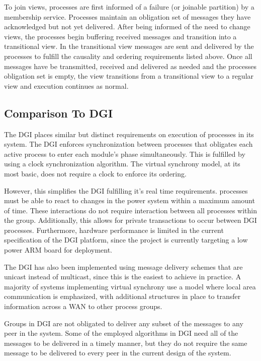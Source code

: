 To join views, processes are first informed of a failure (or joinable partition) 
by a membership service. Processes maintain an obligation set of messages they
have acknowledged but not yet delivered. After being informed of the need to
change views, the processes begin buffering received messages and transition
into a transitional view. In the transitional view messages are sent and
delivered by the processes to fulfill the causality and ordering requirements
listed above. Once all messages have be transmitted, received and delivered as
needed and the processes obligation set is empty, the view transitions from a
transitional view to a regular view and execution continues as normal.

\subsection{Comparison To DGI}

The DGI places similar but distinct requirements on execution of processes in
its system. The DGI enforces synchronization between processes that obligates
each active process to enter each module's phase simultaneously. This is
fulfilled by using a clock synchronization algorithm. The virtual synchrony
model, at its most basic, does not require a clock to enforce its ordering.

However, this simplifies the DGI fulfilling it's real time requirements. 
processes must be able to react to changes in the power system within a
maximum amount of time. These interactions do not require interaction between
all processes within the group. Additionally, this allows for private
transactions to occur between DGI processes. Furthermore, hardware performance
is limited in the current specification of the DGI platform, since the
project is currently targeting a low power ARM board for deployment.

The DGI has also been implemented using message delivery schemes that are
unicast instead of multicast, since this is the easiest to achieve in
practice. A majority of systems implementing virtual synchrony use a model 
where local area communication is emphasized, with additional structures in
place to transfer information across a WAN to other process groups.

Groups in DGI are not obligated to deliver any subset of the messages to any
peer in the system. Some of the employed algorithms in DGI need all of the
messages to be delivered in a timely manner, but they do not require the same
message to be delivered to every peer in the current design of the system.

